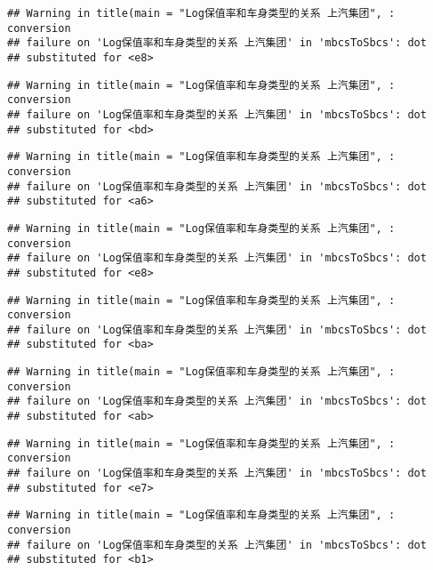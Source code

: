 \documentclass[]{article}
\begin{document}
\begin{verbatim}
## Warning in title(main = "Log保值率和车身类型的关系 上汽集团", : conversion
## failure on 'Log保值率和车身类型的关系 上汽集团' in 'mbcsToSbcs': dot
## substituted for <e8>
\end{verbatim}

\begin{verbatim}
## Warning in title(main = "Log保值率和车身类型的关系 上汽集团", : conversion
## failure on 'Log保值率和车身类型的关系 上汽集团' in 'mbcsToSbcs': dot
## substituted for <bd>
\end{verbatim}

\begin{verbatim}
## Warning in title(main = "Log保值率和车身类型的关系 上汽集团", : conversion
## failure on 'Log保值率和车身类型的关系 上汽集团' in 'mbcsToSbcs': dot
## substituted for <a6>
\end{verbatim}

\begin{verbatim}
## Warning in title(main = "Log保值率和车身类型的关系 上汽集团", : conversion
## failure on 'Log保值率和车身类型的关系 上汽集团' in 'mbcsToSbcs': dot
## substituted for <e8>
\end{verbatim}

\begin{verbatim}
## Warning in title(main = "Log保值率和车身类型的关系 上汽集团", : conversion
## failure on 'Log保值率和车身类型的关系 上汽集团' in 'mbcsToSbcs': dot
## substituted for <ba>
\end{verbatim}

\begin{verbatim}
## Warning in title(main = "Log保值率和车身类型的关系 上汽集团", : conversion
## failure on 'Log保值率和车身类型的关系 上汽集团' in 'mbcsToSbcs': dot
## substituted for <ab>
\end{verbatim}

\begin{verbatim}
## Warning in title(main = "Log保值率和车身类型的关系 上汽集团", : conversion
## failure on 'Log保值率和车身类型的关系 上汽集团' in 'mbcsToSbcs': dot
## substituted for <e7>
\end{verbatim}

\begin{verbatim}
## Warning in title(main = "Log保值率和车身类型的关系 上汽集团", : conversion
## failure on 'Log保值率和车身类型的关系 上汽集团' in 'mbcsToSbcs': dot
## substituted for <b1>
\end{verbatim}
\end{document}
